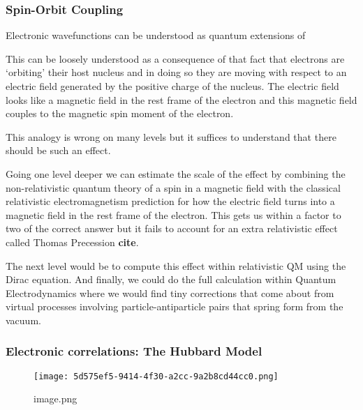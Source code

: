 \hypertarget{spin-orbit-coupling}{%
\subsubsection{Spin-Orbit Coupling}\label{spin-orbit-coupling}}

Electronic wavefunctions can be understood as quantum extensions of

This can be loosely understood as a consequence of that fact that electrons are `orbiting' their host nucleus and in doing so they are moving with respect to an electric field generated by the positive charge of the nucleus. The electric field looks like a magnetic field in the rest frame of the electron and this magnetic field couples to the magnetic spin moment of the electron.

This analogy is wrong on many levels but it suffices to understand that there should be such an effect.

Going one level deeper we can estimate the scale of the effect by combining the non-relativistic quantum theory of a spin in a magnetic field with the classical relativistic electromagnetism prediction for how the electric field turns into a magnetic field in the rest frame of the electron. This gets us within a factor to two of the correct answer but it fails to account for an extra relativistic effect called Thomas Precession \textbf{cite}.

The next level would be to compute this effect within relativistic QM using the Dirac equation. And finally, we could do the full calculation within Quantum Electrodynamics where we would find tiny corrections that come about from virtual processes involving particle-antiparticle pairs that spring form from the vacuum.

\hypertarget{electronic-correlations-the-hubbard-model}{%
\subsubsection{Electronic correlations: The Hubbard Model}\label{electronic-correlations-the-hubbard-model}}

\begin{fignos:no-prefix-figure-caption}

\begin{figure}
\centering
\texttt{[image: 5d575ef5-9414-4f30-a2cc-9a2b8cd44cc0.png]}
\caption{image.png}
\end{figure}

\end{fignos:no-prefix-figure-caption}

